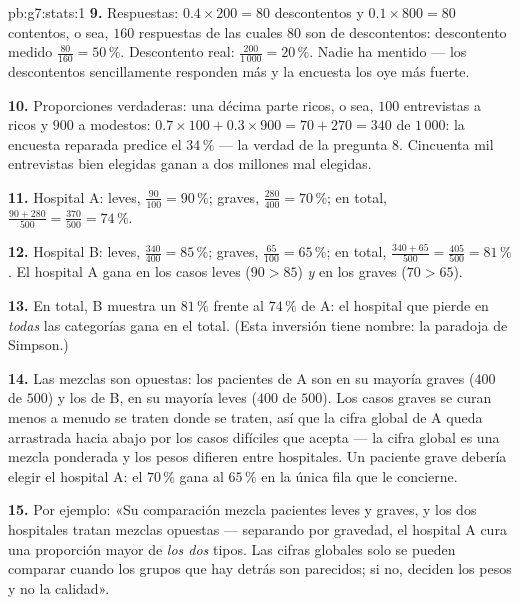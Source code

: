 \begin{solution}{pb:g7:stats:1}
\textbf{9.} Respuestas: $0.4 \times 200 = 80$ descontentos y
$0.1 \times 800 = 80$ contentos, o sea, $160$ respuestas de las cuales $80$
son de descontentos: descontento medido $\frac{80}{160} = 50\,\%$. Descontento
real: $\frac{200}{1\,000} = 20\,\%$. Nadie ha mentido ---
los descontentos sencillamente responden más y la encuesta los oye
más fuerte.

\textbf{10.} Proporciones verdaderas: una décima parte ricos, o sea, $100$
entrevistas a ricos y $900$ a modestos:
$0.7 \times 100 + 0.3 \times 900 = 70 + 270 = 340$ de
$1\,000$: la encuesta reparada predice el $34\,\%$ --- la verdad de
la pregunta 8. Cincuenta mil entrevistas bien elegidas ganan a dos
millones mal elegidas.

\textbf{11.} Hospital A: leves, $\frac{90}{100} = 90\,\%$; graves,
$\frac{280}{400} = 70\,\%$; en total,
$\frac{90 + 280}{500} = \frac{370}{500} = 74\,\%$.

\textbf{12.} Hospital B: leves, $\frac{340}{400} = 85\,\%$;
graves, $\frac{65}{100} = 65\,\%$; en total,
$\frac{340 + 65}{500} = \frac{405}{500} = 81\,\%$. El hospital A
gana en los casos leves ($90 > 85$) \emph{y} en los graves
($70 > 65$).

\textbf{13.} En total, B muestra un $81\,\%$ frente al $74\,\%$ de A:
el hospital que pierde en \emph{todas} las categorías gana en el
total. (Esta inversión tiene nombre: la paradoja de Simpson.)

\textbf{14.} Las mezclas son opuestas: los pacientes de A son en su mayoría
graves ($400$ de $500$) y los de B, en su mayoría leves ($400$ de $500$).
Los casos graves se curan menos a menudo se traten donde se traten, así que la
cifra global de A queda arrastrada hacia abajo por los casos difíciles que acepta ---
la cifra global es una mezcla ponderada y los pesos difieren entre
hospitales. Un paciente grave debería elegir el hospital A: el $70\,\%$
gana al $65\,\%$ en la única fila que le concierne.

\textbf{15.} Por ejemplo: «Su comparación mezcla pacientes leves y
graves, y los dos hospitales tratan mezclas opuestas ---
separando por gravedad, el hospital A cura una proporción mayor de
\emph{los dos} tipos. Las cifras globales solo se pueden comparar cuando los
grupos que hay detrás son parecidos; si no, deciden los pesos y no la
calidad».
\end{solution}
